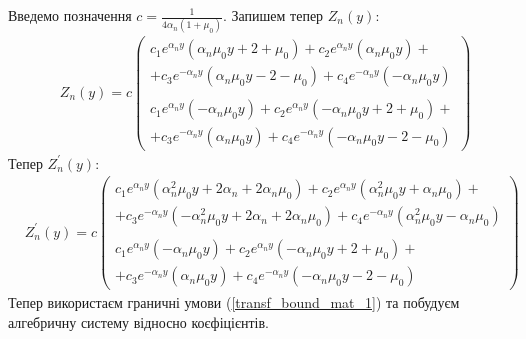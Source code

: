 \documentclass[a4paper,14pt]{extarticle}
\numberwithin{equation}{section}
\begin{document}
Введемо позначення $c = \frac{1}{4\alpha_n (1 + \mu_0)}$. \newline
Запишем тепер $Z_n(y)$:
\begin{align*}
    &Z_n(y) = c
    \begin{pmatrix}
        c_1 e^{\alpha_n y} (\alpha_n \mu_0 y + 2 + \mu_0) + c_2 e^{\alpha_n y} (\alpha_n \mu_0 y) + 
        \\ + c_3 e^{-\alpha_n y} (\alpha_n \mu_0 y - 2 - \mu_0) + c_4 e^{-\alpha_n y} (-\alpha_n \mu_0 y) \\
        \\
        c_1 e^{\alpha_n y} (-\alpha_n \mu_0 y) + c_2 e^{\alpha_n y} (-\alpha_n \mu_0 y + 2 + \mu_0) + 
        \\ + c_3 e^{-\alpha_n y} (\alpha_n \mu_0 y) + c_4 e^{-\alpha_n y} (-\alpha_n \mu_0 y - 2 - \mu_0)
    \end{pmatrix}
\end{align*}
Тепер $Z_n^{'}(y)$:
\begin{align*}
    &Z_n^{'}(y) = c
    \begin{pmatrix}
        c_1 e^{\alpha_n y} (\alpha_n^2 \mu_0 y + 2 \alpha_n + 2 \alpha_n \mu_0) + c_2 e^{\alpha_n y} (\alpha_n^2 \mu_0 y + \alpha_n \mu_0) + 
        \\ + c_3 e^{-\alpha_n y} (-\alpha_n^2 \mu_0 y + 2 \alpha_n + 2 \alpha_n \mu_0) + c_4 e^{-\alpha_n y} (\alpha_n^2 \mu_0 y - \alpha_n \mu_0) \\
        \\
        c_1 e^{\alpha_n y} (-\alpha_n \mu_0 y) + c_2 e^{\alpha_n y} (-\alpha_n \mu_0 y + 2 + \mu_0) + 
        \\ + c_3 e^{-\alpha_n y} (\alpha_n \mu_0 y) + c_4 e^{-\alpha_n y} (-\alpha_n \mu_0 y - 2 - \mu_0)
    \end{pmatrix}
\end{align*}
Тепер використаєм граничні умови (\ref{transf_bound_mat_1}) та побудуєм алгебричну систему відносно коєфіцієнтів.
\end{document}
